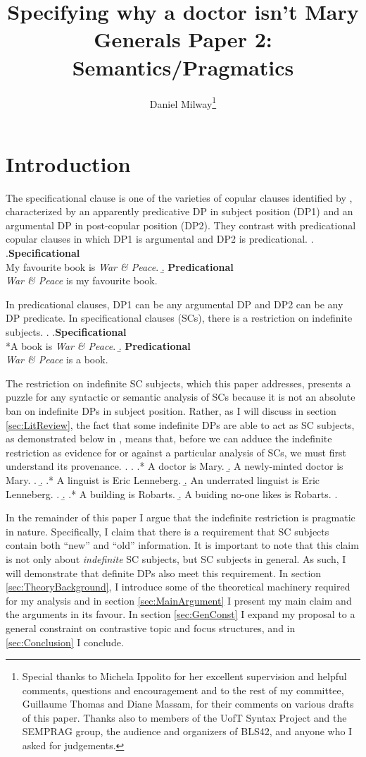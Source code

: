 \documentclass[letterpaper]{article}
\title{Specifying why a doctor isn't Mary\\
\large Generals Paper 2: Semantics/Pragmatics}
\author{Daniel Milway\thanks{
  Special thanks to Michela Ippolito for her excellent supervision and helpful comments, questions and encouragement and to the rest of my committee, Guillaume Thomas and Diane Massam, for their comments on various drafts of this paper.
  Thanks also to members of the UofT Syntax Project and the SEMPRAG group, the audience and organizers of BLS42, and anyone who I asked for judgements.
}}
\begin{document}
\maketitle
\doublespacing
\section{Introduction}
The specificational clause is one of the varieties of copular clauses identified by \textcite{higgins1973pseudo}, characterized by an apparently predicative DP in subject position (DP1) and an argumental DP in post-copular position (DP2).
They contrast with predicational copular clauses in which DP1 is argumental and DP2 is predicational.
\ex.
\a.\textbf{Specificational}\\
My favourite book is \textit{War \& Peace}.
\b. \textbf{Predicational}\\
\textit{War \& Peace} is my favourite book.

In predicational clauses, DP1 can be any argumental DP and DP2 can be any DP predicate.
In specificational clauses (SCs), there is a restriction on indefinite subjects.
\ex.\label{ex:TheData}
\a.\textbf{Specificational}\\
*A book is \textit{War \& Peace}.
\b. \textbf{Predicational}\\
\textit{War \& Peace} is a book.

The restriction on indefinite SC subjects, which this paper addresses, presents a puzzle for any syntactic or semantic analysis of SCs because it is not an absolute ban on indefinite DPs in subject position.
Rather, as I will discuss in section \ref{sec:LitReview}, the fact that some indefinite DPs are able to act as SC subjects, as demonstrated below in \Next, means that, before we can adduce the indefinite restriction as evidence for or against a particular analysis of SCs, we must first understand its provenance.
\ex.\label{ex:TheData} 
\a.
\a.* A doctor is Mary.
\b. A newly-minted doctor is Mary.
\z.
\b.
\a.* A linguist is Eric Lenneberg.
\b. An underrated linguist is Eric Lenneberg.
\z.
\b.
\a.* A building is Robarts.
\b. A buiding no-one likes is Robarts.
\z.

In the remainder of this paper I argue that the indefinite restriction is pragmatic in nature.
Specifically, I claim that there is a requirement that SC subjects contain both ``new'' and ``old'' information.
It is important to note that this claim is not only about \textit{indefinite} SC subjects, but SC subjects in general.
As such, I will demonstrate that definite DPs also meet this requirement.
In section \ref{sec:TheoryBackground}, I introduce some of the theoretical machinery required for my analysis and in section \ref{sec:MainArgument} I present my main claim and the arguments in its favour.
In section \ref{sec:GenConst} I expand my proposal to a general constraint on contrastive topic and focus structures, and in \ref{sec:Conclusion} I conclude.
\end{document}
